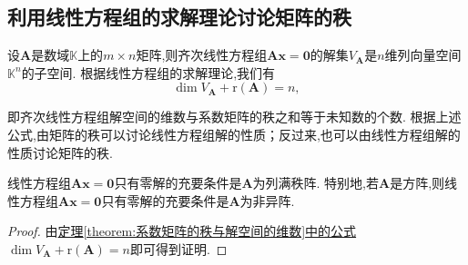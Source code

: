 \documentclass[../../main.tex]{subfiles}%
\begin{document}
\subsection{利用线性方程组的求解理论讨论矩阵的秩}

\begin{theorem}\label{theorem:系数矩阵的秩与解空间的维数}
设\(\boldsymbol{A}\)是数域\(\mathbb{K}\)上的\(m\times n\)矩阵,则齐次线性方程组\(\boldsymbol{A}\boldsymbol{x}=\boldsymbol{0}\)的解集\(V_{\boldsymbol{A}}\)是\(n\)维列向量空间\(\mathbb{K}^n\)的子空间. 根据线性方程组的求解理论,我们有
\[
\dim V_{\boldsymbol{A}}+\mathrm{r}(\boldsymbol{A}) = n,
\]
\end{theorem}
\begin{note}
即齐次线性方程组解空间的维数与系数矩阵的秩之和等于未知数的个数. 根据上述公式,由矩阵的秩可以讨论线性方程组解的性质；反过来,也可以由线性方程组解的性质讨论矩阵的秩. 
\end{note}

\begin{corollary}\label{corollary:线性方程组只有零解的充要条件}
线性方程组\(\boldsymbol{A}\boldsymbol{x}=\boldsymbol{0}\)只有零解的充要条件是\(\boldsymbol{A}\)为列满秩阵. 特别地,若\(\boldsymbol{A}\)是方阵,则线性方程组\(\boldsymbol{A}\boldsymbol{x}=\boldsymbol{0}\)只有零解的充要条件是\(\boldsymbol{A}\)为非异阵. 
\end{corollary}
\begin{proof}

由\hyperref[theorem:系数矩阵的秩与解空间的维数]{定理\ref{theorem:系数矩阵的秩与解空间的维数}中的公式}\(\dim V_{\boldsymbol{A}}+\mathrm{r}(\boldsymbol{A}) = n\)即可得到证明.

\end{proof}
\end{document}
